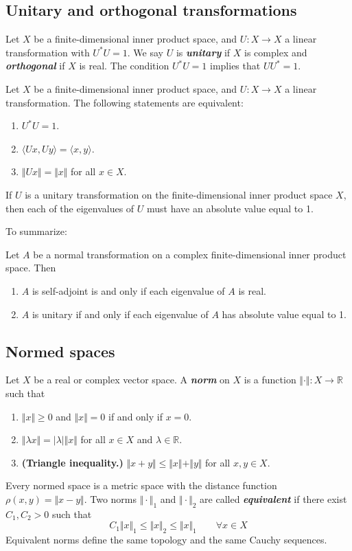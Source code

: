 \documentclass{article}
\theoremstyle{definition}
\numberwithin{equation}{section}
\newcommand{\R}{\mathbb{R}}
\begin{document}
	\subsection{Unitary and orthogonal transformations}
	Let $X$ be a finite-dimensional inner product space, and $U:X\to X$ a linear transformation with $U^*U=1$. We say $U$ is \textbf{\textit{unitary}} if $X$ is complex and \textbf{\textit{orthogonal}} if $X$ is real. The condition $U^*U=1$ implies that $UU^*=1$.
	
	\begin{thm}
		Let $X$ be a finite-dimensional inner product space, and $U:X\to X$ a linear transformation. The following statements are equivalent:
		\begin{enumerate}
			\item $U^*U=1$.
			\item $\langle Ux,Uy\rangle=\langle x,y\rangle$.
			\item $\Vert Ux\Vert=\Vert x\Vert$ for all $x\in X$.
		\end{enumerate}
	\end{thm}
	\begin{thm}
		If $U$ is a unitary transformation on the finite-dimensional inner product space $X$, then each of the eigenvalues of $U$ must have an absolute value equal to 1.
	\end{thm}
	To summarize:
	\begin{thm}
		Let $A$ be a normal transformation on a complex finite-dimensional inner product space. Then
		\begin{enumerate}
			\item $A$ is self-adjoint is and only if each eigenvalue of $A$ is real.
			\item $A$ is unitary if and only if each eigenvalue of $A$ has absolute value equal to 1.
		\end{enumerate}
	\end{thm}

\subsection{Normed spaces}
	Let $X$ be a real or complex vector space. A \textbf{\textit{norm}} on $X$ is a function $\Vert \cdot\Vert:X\to\R$ such that
\begin{enumerate}
	\item $\Vert x\Vert\geq0$ and $\Vert x\Vert=0$ if and only if $x=0$.
	\item $\Vert\lambda x\Vert=|\lambda|\Vert x\Vert$ for all $x\in X$ and $\lambda\in\R$.
	\item \textbf{(Triangle inequality.)} $\Vert x+y\Vert\leq\Vert x\Vert+\Vert y\Vert$ for all $x,y\in X$.
\end{enumerate}
Every normed space is a metric space with the distance function $\rho(x,y)=\Vert x-y\Vert$. Two norms $\Vert\cdot\Vert_1$ and $\Vert\cdot\Vert_2$ are called \textbf{\textit{equivalent}} if there exist $C_1,C_2>0$ such that
\[C_1\Vert x\Vert_1\leq \Vert x\Vert_2\leq \Vert x\Vert_1\qquad\forall x\in X\]
Equivalent norms define the same topology and the same Cauchy sequences.
\end{document}
